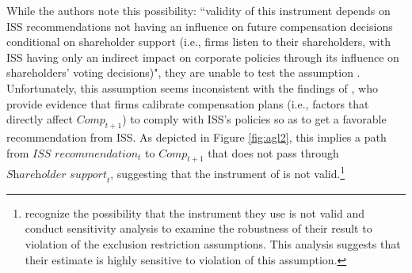 \documentclass[12pt,reqno,titlepage]{amsart}
\begin{document}
\begin{doublespace}
While the authors note this possibility: ``validity of this instrument depends on ISS recommendations not having an influence on future compensation decisions conditional on shareholder support (i.e., firms listen to their shareholders, with ISS having only an indirect impact on corporate policies through its influence on shareholders' voting decisions)", they are unable to test the assumption \citep[p.\,912]{Armstrong:2013io}.
Unfortunately, this assumption seems inconsistent with the findings of \citet{Gow:2013aa}, who provide evidence that firms calibrate compensation plans (i.e., factors that directly affect $\textit{Comp}_{t+1}$) to comply with ISS's policies so as to get a favorable recommendation from ISS. 
As depicted in Figure \ref{fig:agl2}, this implies a path from $\textit{ISS recommendation}_t$ to $\textit{Comp}_{t+1}$ that does not pass through $\textit{Shareholder support}_{t}$, suggesting that the instrument of \citet[p.\,912]{Armstrong:2013io} is not valid.\footnote{\citet{Armstrong:2013io} recognize the possibility that the instrument they use is not valid and conduct sensitivity analysis to examine the robustness of their result to violation of the exclusion restriction assumptions. 
This analysis suggests that their estimate is highly sensitive to violation of this assumption.}




\end{doublespace}
\end{document}

